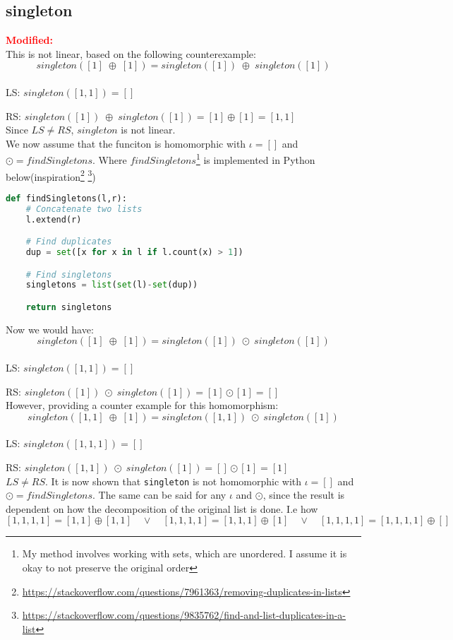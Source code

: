\subsection*{singleton}
\textcolor{red}{\textbf{Modified:}}\\
This is not linear, based on the following counterexample:
$$
  singleton( [1] \; \oplus \; [1]) = singleton( [1]) \; \oplus \; singleton([1])
$$
\\
LS: \tab
$
 singleton( [1,1] ) = []
$

RS: \tab
$
singleton( [1]) \; \oplus \; singleton([1]) = [1] \oplus [1] = [1,1]
$
\\

Since $LS \neq RS$, $singleton$ is not linear. \\
We now assume that the funciton is homomorphic with $\iota = []$ and $\odot = findSingletons $. Where $findSingletons$\footnote{My method involves working with sets, which are unordered. I assume it is okay to not preserve the original order }  is implemented in Python below(inspiration\footnote{\url{https://stackoverflow.com/questions/7961363/removing-duplicates-in-lists}} \footnote{\url{https://stackoverflow.com/questions/9835762/find-and-list-duplicates-in-a-list}})
\begin{lstlisting}[language = Python]
def findSingletons(l,r):
    # Concatenate two lists
    l.extend(r)

    # Find duplicates
    dup = set([x for x in l if l.count(x) > 1])

    # Find singletons
    singletons = list(set(l)-set(dup))

    return singletons
\end{lstlisting}
Now we would have:
$$
singleton( [1] \; \oplus \; [1]) = singleton( [1]) \; \odot \; singleton([1])
$$
\\
LS: \tab
$
singleton( [1,1] ) = []
$

RS: \tab
$
singleton( [1]) \; \odot \; singleton([1]) = [1] \odot [1] = []
$
\\

However, providing a counter example for this homomorphism:
$$
singleton( [1,1] \; \oplus \; [1]) = singleton( [1,1]) \; \odot \; singleton([1])
$$
\\
LS: \tab
$
singleton( [1,1,1] ) = []
$

RS: \tab
$
singleton( [1,1]) \; \odot \; singleton([1]) = [] \odot [1] = [1]
$
\\

$LS \neq RS$. It is now shown that \texttt{singleton} is not homomorphic with $\iota = []$ and $\odot = findSingletons $. The same can be said for any $\iota$ and $\odot$, since the result is dependent on how the decomposition of the original list is done. I.e how $[1,1,1,1] = [1,1] \oplus [1,1] \quad \vee \quad [1,1,1,1] = [1,1,1] \oplus [1] \quad \vee \quad [1,1,1,1] = [1,1,1,1] \oplus []$ \\

